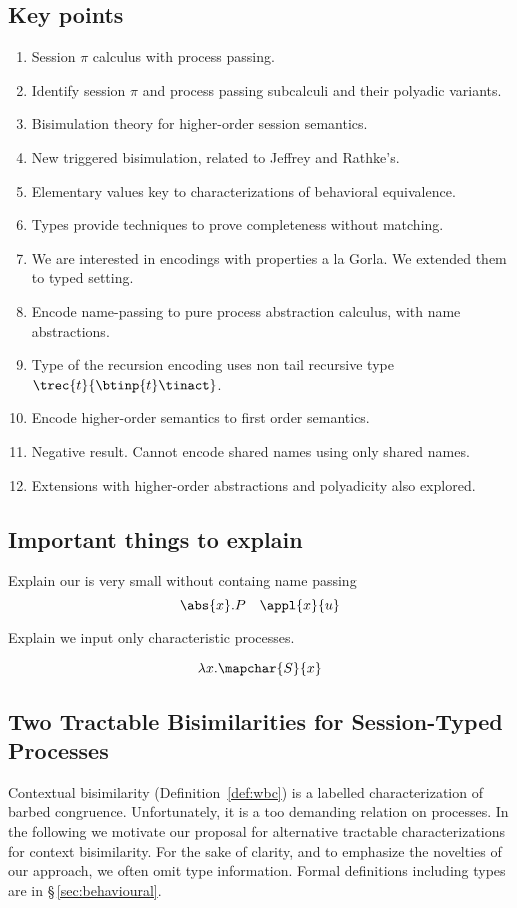 \subsection{Key points}
\begin{enumerate}[1.]
	\item	Session $\pi$ calculus with process passing.
	\item	Identify session $\pi$ and process passing subcalculi and their polyadic variants.
	\item	Bisimulation theory for higher-order session semantics.
	\item	New triggered bisimulation, related to Jeffrey and Rathke's.
	\item   Elementary values key to characterizations of behavioral equivalence.
	\item	Types provide techniques to prove completeness without matching.
	\item	We are interested in encodings with properties a la Gorla. 
                We extended them to typed setting. 
	\item	Encode name-passing to pure process abstraction calculus, with name abstractions.
	\item	Type of the recursion encoding uses non tail recursive type $\trec{t}{\btinp{t} \tinact}$.
	\item	Encode higher-order semantics to first order semantics.
	\item	Negative result. Cannot encode shared names using only shared names.
	\item   Extensions with higher-order abstractions and polyadicity also explored.
\end{enumerate}

\smallskip 

\subsection{Important things to explain}
Explain our \HO is very small without containg name passing 
\[ 
\abs{x}.P \quad \appl{x}{u}
\]

Explain we input only characteristic processes.  

\[
\lambda x.\mapchar{S}{x}
\]


\subsection{Two Tractable Bisimilarities for Session-Typed Processes}
\noi 
Contextual bisimilarity (Definition~\ref{def:wbc}) is a labelled characterization of barbed congruence. 
Unfortunately, it is a too demanding relation on processes. In the following we motivate our
proposal for alternative tractable characterizations for context bisimilarity. 
For the sake of clarity, and to emphasize the novelties of our approach, 
we often omit type information. Formal definitions including types are in \S\,\ref{sec:behavioural}.

